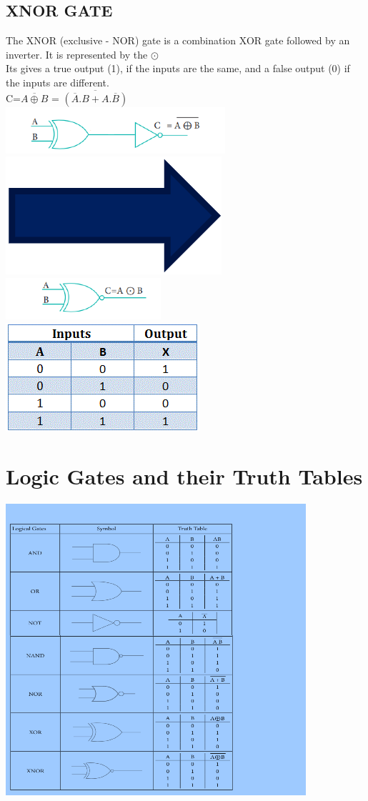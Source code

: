 \documentclass{article}
\begin{document}
\subsection{XNOR GATE}
The XNOR (exclusive - NOR) gate is a combination XOR gate followed by an inverter. It is represented by the $\odot$\\
Its gives a  true output (1), if the inputs are the same, and a false output (0) if the inputs are different.\\
C=$\overline{A \oplus B}$ = $\overline{(\overline{A}.B + A.\overline{B})}$\\
\includegraphics[width=0.3\linewidth]{10}\includegraphics[width=0.1\linewidth]{Picture 5.1.png} \includegraphics[width=0.3\linewidth]{11.1}\\
\includegraphics[width=0.8\linewidth]{Unknown-7.png}\\
\newpage
\section{Logic Gates and their Truth Tables}
\includegraphics[width=1.0\linewidth]{11}
\newpage
\end{document}
